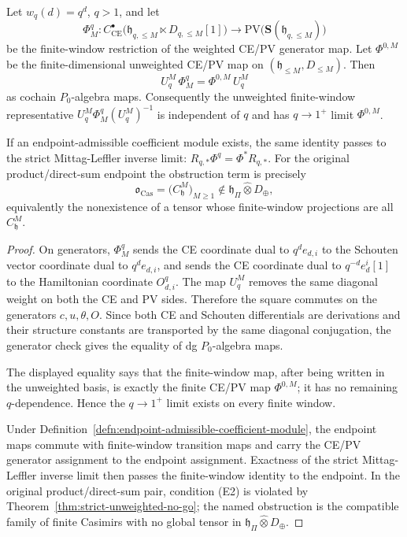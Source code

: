 \begin{thm}
\label{thm:wt-ce-pv-qtoone-stabilization}
  Let \(w_q(d)=q^d\), \(q>1\), and let
  \[
    \Phi^q_M\colon
    C^\bullet_{\mathrm{CE}}
      \bigl(\mathfrak h_{q,\leq M}\ltimes D_{q,\leq M}[1]\bigr)
    \longrightarrow
    \mathrm{PV}\bigl(\mathbf S(\mathfrak h_{q,\leq M})\bigr)
  \]
  be the finite-window restriction of the weighted CE/PV generator map.
  Let \(\Phi^{0,M}\) be the finite-dimensional unweighted CE/PV map on
  \((\mathfrak h_{\leq M},D_{\leq M})\).  Then
  \[
    U^M_q\,\Phi^q_M=\Phi^{0,M}\,U^M_q
  \]
  as cochain \(P_0\)-algebra maps.  Consequently the unweighted
  finite-window representative \(U^M_q\Phi^q_M(U^M_q)^{-1}\) is
  independent of \(q\) and has \(q\to1^+\) limit \(\Phi^{0,M}\).

  If an endpoint-admissible coefficient module exists, the same
  identity passes to the strict Mittag-Leffler inverse limit:
  \(R_{q,\ast}\Phi^q=\Phi^\ast R_{q,\ast}\).  For the original
  product/direct-sum endpoint the obstruction term is precisely
  \[
    \mathfrak o_{\mathrm{Cas}}
      =\bigl(C^M_{\mathfrak h}\bigr)_{M\geq1}
      \notin
      \mathfrak h_\Pi\widehat\otimes D_\oplus ,
  \]
  equivalently the nonexistence of a tensor whose finite-window
  projections are all \(C^M_{\mathfrak h}\).
\end{thm}

\begin{proof}
  On generators, \(\Phi^q_M\) sends the CE coordinate dual to
  \(q^de_{d,i}\) to the Schouten vector coordinate dual to
  \(q^de_{d,i}\), and sends the CE coordinate dual to
  \(q^{-d}e_d^i[1]\) to the Hamiltonian coordinate
  \(O_{d,i}^{q}\).  The map \(U^M_q\) removes the same diagonal weight
  on both the CE and PV sides.  Therefore the square commutes on the
  generators \(c,u,\theta,O\).  Since both CE and Schouten
  differentials are derivations and their structure constants are
  transported by the same diagonal conjugation, the generator check
  gives the equality of dg \(P_0\)-algebra maps.

  The displayed equality says that the finite-window map, after being
  written in the unweighted basis, is exactly the finite CE/PV map
  \(\Phi^{0,M}\); it has no remaining \(q\)-dependence.  Hence the
  \(q\to1^+\) limit exists on every finite window.

  Under Definition~\ref{defn:endpoint-admissible-coefficient-module},
  the endpoint maps commute with finite-window transition maps and
  carry the CE/PV generator assignment to the endpoint assignment.
  Exactness of the strict Mittag-Leffler inverse limit then passes the
  finite-window identity to the endpoint.  In the original
  product/direct-sum pair, condition (E2) is violated by
  Theorem~\ref{thm:strict-unweighted-no-go}; the named obstruction is
  the compatible family of finite Casimirs with no global tensor in
  \(\mathfrak h_\Pi\widehat\otimes D_\oplus\).
\end{proof}

